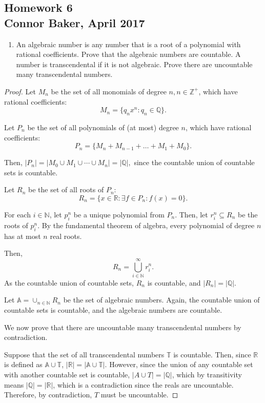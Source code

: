 \documentclass[10pt]{article}
\theoremstyle{definition}
\theoremstyle{plain}
\newcommand{\N}{\mathbb{N}}
\newcommand{\Z}{\mathbb{Z}}
\newcommand{\Q}{\mathbb{Q}}
\newcommand{\R}{\mathbb{R}}
\begin{document}

\begin{center}
  \subsection*{Homework 6\\Connor Baker, April 2017}
\end{center}

\begin{enumerate}
\item An algebraic number is any number that is a root of a polynomial with rational coefficients.  Prove that the algebraic numbers are countable.  A number is transcendental if it is not algebraic.  Prove there are uncountable many transcendental numbers.
\end{enumerate}

\begin{proof}
  Let $M_n$ be the set of all monomials of degree $n,n\in\Z^+$, which have rational coefficients:
  $$M_n = \{q_n x^n: q_n \in\Q\}.$$

  Let $P_n$ be the set of all polynomials of (at most) degree $n$, which have rational coefficients:
  $$P_n = \{M_n + M_{n-1} + \dots + M_1 + M_0\}.$$

  Then, $|P_n|=|M_0\cup M_1\cup \cdots \cup M_n| = |\Q|,$ since the countable union of countable sets is countable.

  Let $R_n$ be the set of all roots of $P_n$:
  $$R_n= \{x\in\R: \exists f\in P_n: f(x)= 0\}.$$

  For each $i\in\N$, let $p_i^n$ be a unique polynomial from $P_n$. Then, let $r_i^n\subseteq R_n$ be the roots of $p_i^n$. By the fundamental theorem of algebra, every polynomial of degree $n$ has at most $n$ real roots.

  Then, $$R_n = \bigcup_{i\in\N}^\infty r_i^n.$$
  As the countable union of countable sets, $R_n$ is countable, and $|R_n|=|\Q|$.

  Let $\mathbb{A} = \cup_{n\in\N} R_n$ be the set of algebraic numbers. Again, the countable union of countable sets is countable, and the algebraic numbers are countable.

  We now prove that there are uncountable many transcendental numbers by contradiction.

  Suppose that the set of all transcendental numbers $\mathbb{T}$ is countable. Then, since $\R$ is defined as $\mathbb{A}\cup\mathbb{T}$, $|\R|=|\mathbb{A}\cup\mathbb{T}|$. However, since the union of any countable set with another countable set is countable, $|A\cup T| = |\Q|$, which by transitivity means $|\Q|=|\R|$, which is a contradiction since the reals are uncountable. Therefore, by contradiction, $T$ must be uncountable.
\end{proof}
\end{document}

